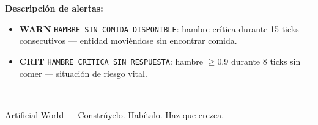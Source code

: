 \documentclass[12pt,a4paper]{article}
\begin{document}
\vspace{8pt}

\noindent\textbf{Descripci\'on de alertas:}

\begin{itemize}[leftmargin=1.5em, itemsep=4pt]
  \item \textcolor{warncolor}{\textbf{WARN}} \texttt{HAMBRE\_SIN\_COMIDA\_DISPONIBLE}:
    hambre cr\'itica durante 15 ticks consecutivos --- entidad movi\'endose sin encontrar comida.

  \item \textcolor{critcolor}{\textbf{CRIT}} \texttt{HAMBRE\_CRITICA\_SIN\_RESPUESTA}:
    hambre $\geq 0.9$ durante 8 ticks sin comer --- situaci\'on de riesgo vital.
\end{itemize}

\vfill
\begin{center}
  \color{textmuted}\small\rule{0.5\linewidth}{0.4pt}\\[4pt]
  Artificial World --- Constr\'uyelo. Hab\'italo. Haz que crezca.
\end{center}
\end{document}
